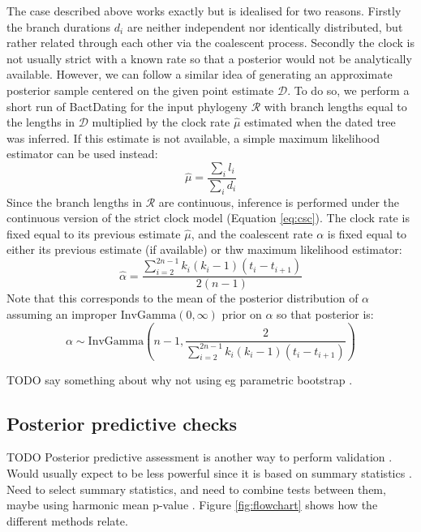 \documentclass{article}
\begin{document}
The case described above works exactly but is idealised for two reasons.
Firstly the branch durations $d_i$ are neither independent nor identically distributed,
but rather related through each other via the coalescent process. Secondly
the clock is not usually strict with a known rate so that
a posterior would not be analytically available. 
However, we can follow
a similar idea of generating an approximate posterior sample centered on the given
point estimate $\mathcal{D}$. To do so, we perform a short run of BactDating \citep{Didelot2018}
for the input phylogeny $\mathcal{R}$ 
with branch lengths equal to
the lengths in $\mathcal{D}$ multiplied by the clock rate 
$\hat \mu$ estimated when the dated tree was inferred. 
If this estimate is not available, a simple maximum likelihood
estimator can be used instead: 
\begin{equation}
\hat \mu = \frac{\sum_i l_i}{\sum_i d_i}
\end{equation}
Since the branch lengths in $\mathcal{R}$ are continuous, 
inference is performed under the 
continuous version of the strict clock model (Equation \ref{eq:csc}).  
The clock rate is fixed equal to its previous estimate $\hat \mu$, and the coalescent rate $\alpha$
is fixed equal to either its previous estimate (if available) or
thw maximum likelihood estimator:
\begin{equation}
\hat \alpha = \frac{\sum_{i=2}^{2n-1}k_i (k_i-1)(t_i-t_{i+1})}{2(n-1)}
\end{equation}
Note that this corresponds to the mean of the posterior distribution of $\alpha$ 
assuming an improper $\mathrm{InvGamma}(0,\infty)$ prior on $\alpha$ so that posterior is:
\begin{equation}
\alpha \sim \mathrm{InvGamma}\left(n-1, \frac{2}{\sum_{i=2}^{2n-1}k_i (k_i-1)(t_i-t_{i+1})}\right)
\end{equation}

TODO say something about why not using eg 
parametric bootstrap \citep{efronBayesianInferenceParametric2012}.

\subsection*{Posterior predictive checks}

TODO Posterior predictive assessment is another way to perform
validation \citep{Meng1994,Gelman1996}.
Would usually expect to be less powerful since it is 
based on summary statistics \citep{gibsonComparisonAssessmentEpidemic2018}.
Need to select summary statistics, and need to combine
tests between them, maybe using harmonic mean
p-value \citep{wilsonHarmonicMeanPvalue2019}.
 Figure \ref{fig:flowchart} shows how the different methods relate.
\end{document}
